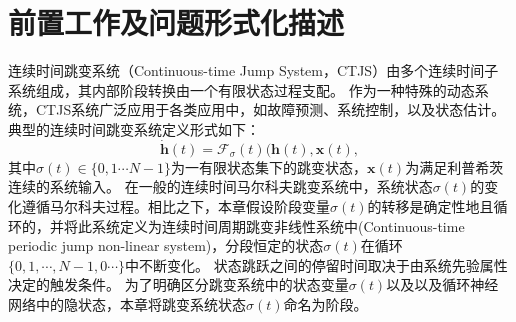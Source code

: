 \section{前置工作及问题形式化描述}
\label{sec:notations}
连续时间跳变系统（Continuous-time Jump System，CTJS）由多个连续时间子系统组成，其内部阶段转换由一个有限状态过程支配\cite{8709809}。
作为一种特殊的动态系统，CTJS系统广泛应用于各类应用中，如故障预测\cite{9165930}、系统控制\cite{pmlr-v120-jansch-porto20a}，以及状态估计\cite{8709809}。
典型的连续时间跳变系统定义形式如下：
\begin{equation}
    \dot{\boldsymbol h}(t)=\mathcal{F}_\sigma(t)(\boldsymbol h(t), \boldsymbol x(t),
    \label{equ:ctjls}
\end{equation}
其中$\sigma(t)\in\{0,1\cdots N-1\}$为一有限状态集下的跳变状态，$\boldsymbol{x}(t)$为满足利普希茨连续的系统输入。
在一般的连续时间马尔科夫跳变系统中，系统状态$\sigma(t)$的变化遵循马尔科夫过程。相比之下，本章假设阶段变量$\sigma(t)$的转移是确定性地且循环的，并将此系统定义为连续时间周期跳变非线性系统中(Continuous-time periodic jump non-linear system)，分段恒定的状态$\sigma(t)$在循环$\{0,1,\cdots,N-1,0 \cdots\}$中不断变化。
状态跳跃之间的停留时间取决于由系统先验属性决定的触发条件。
为了明确区分跳变系统中的状态变量$\sigma(t)$以及以及循环神经网络中的隐状态，本章将跳变系统状态$\sigma(t)$命名为阶段。

